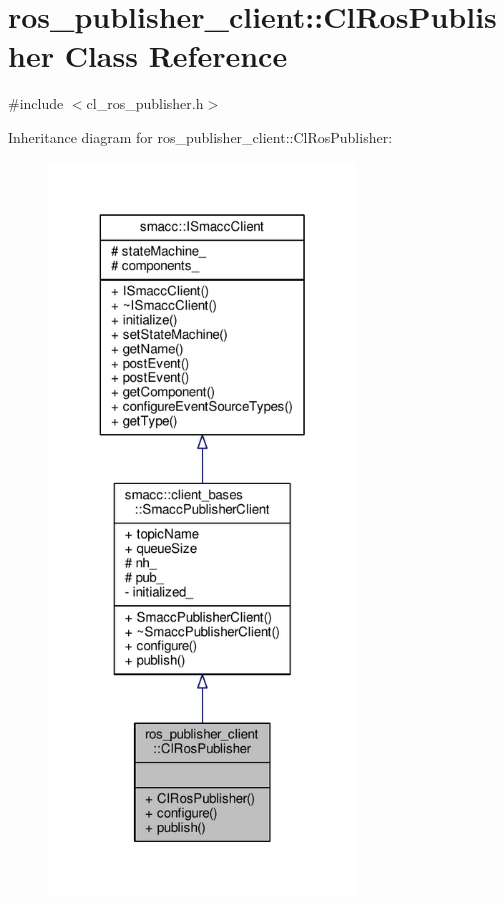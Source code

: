 \hypertarget{classros__publisher__client_1_1ClRosPublisher}{}\section{ros\+\_\+publisher\+\_\+client\+:\+:Cl\+Ros\+Publisher Class Reference}
\label{classros__publisher__client_1_1ClRosPublisher}


{\ttfamily \#include $<$cl\+\_\+ros\+\_\+publisher.\+h$>$}



Inheritance diagram for ros\+\_\+publisher\+\_\+client\+:\+:Cl\+Ros\+Publisher\+:\nopagebreak
\begin{figure}[H]
\begin{center}
\leavevmode
\includegraphics[height=550pt]{classros__publisher__client_1_1ClRosPublisher__inherit__graph}
\end{center}
\end{figure}


